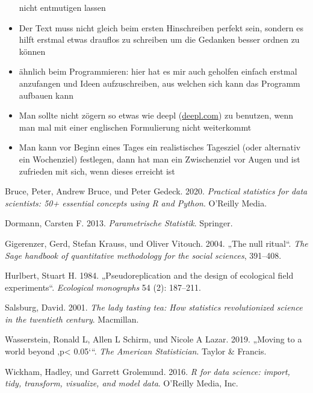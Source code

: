 \documentclass[
  letterpaper,
  DIV=11,
  oneside]{scrreport}
\newlength{\cslhangindent}
\newlength{\cslentryspacingunit} %
\newenvironment{CSLReferences}[2] %
 {%
  \setlength{\parindent}{0pt}
  \ifodd #1
  \let\oldpar\par
  \def\par{\hangindent=\cslhangindent\oldpar}
  \fi
  \setlength{\parskip}{#2\cslentryspacingunit}
 }%
 {}
\begin{document}
\begin{tcolorbox}
\begin{itemize}
  nicht entmutigen lassen
\item
  Der Text muss nicht gleich beim ersten Hinschreiben perfekt sein,
  sondern es hilft erstmal etwas drauflos zu schreiben um die Gedanken
  besser ordnen zu können
\item
  ähnlich beim Programmieren: hier hat es mir auch geholfen einfach
  erstmal anzufangen und Ideen aufzuschreiben, aus welchen sich kann das
  Programm aufbauen kann
\item
  Man sollte nicht zögern so etwas wie deepl
  (\href{www.deepl.com}{deepl.com}) zu benutzen, wenn man mal mit einer
  englischen Formulierung nicht weiterkommt
\item
  Man kann vor Beginn eines Tages ein realistisches Tagesziel (oder
  alternativ ein Wochenziel) festlegen, dann hat man ein Zwischenziel
  vor Augen und ist zufrieden mit sich, wenn dieses erreicht ist
\end{itemize}

\end{tcolorbox}

\hypertarget{refs}{}
\begin{CSLReferences}{1}{0}
\leavevmode{}%
Bruce, Peter, Andrew Bruce, und Peter Gedeck. 2020. \emph{Practical
statistics for data scientists: 50+ essential concepts using R and
Python}. O'Reilly Media.

\leavevmode{}%
Dormann, Carsten F. 2013. \emph{Parametrische Statistik}. Springer.

\leavevmode{}%
Gigerenzer, Gerd, Stefan Krauss, und Oliver Vitouch. 2004. {„The null
ritual``}. \emph{The Sage handbook of quantitative methodology for the
social sciences}, 391--408.

\leavevmode{}%
Hurlbert, Stuart H. 1984. {„Pseudoreplication and the design of
ecological field experiments``}. \emph{Ecological monographs} 54 (2):
187--211.

\leavevmode{}%
Salsburg, David. 2001. \emph{The lady tasting tea: How statistics
revolutionized science in the twentieth century}. Macmillan.

\leavevmode{}%
Wasserstein, Ronald L, Allen L Schirm, und Nicole A Lazar. 2019.
{„Moving to a world beyond {‚p\textless{} 0.05`}``}. \emph{The American
Statistician}. Taylor \& Francis.

\leavevmode{}%
Wickham, Hadley, und Garrett Grolemund. 2016. \emph{R for data science:
import, tidy, transform, visualize, and model data}. O'Reilly Media,
Inc.

\end{CSLReferences}
\end{document}
